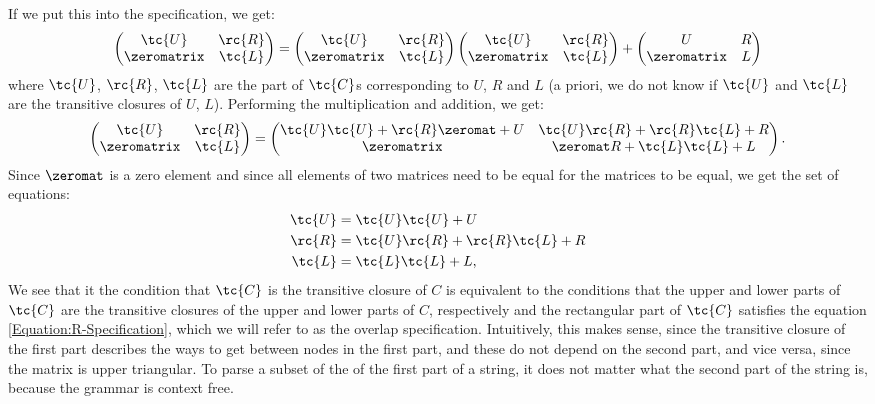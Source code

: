 If we put this into the specification, we get:
\begin{equation*}
  \begin{pmatrix}
    \tc{U} & \rc{R} \\
    \zeromatrix   & \tc{L}
  \end{pmatrix}
  =  
  \begin{pmatrix}
    \tc{U} & \rc{R} \\
    \zeromatrix   & \tc{L}
  \end{pmatrix}
  \begin{pmatrix}
    \tc{U} & \rc{R} \\
    \zeromatrix   & \tc{L}
  \end{pmatrix}
  +
  \begin{pmatrix}
    U & R \\
    \zeromatrix & L
  \end{pmatrix}
\end{equation*}
where $\tc{U}$, $\rc{R}$, $\tc{L}$ are the part of $\tc{C}$s corresponding to $U$, $R$ and $L$ (a priori, we do not know if $\tc{U}$ and $\tc{L}$ are the transitive closures of $U$, $L$). Performing the multiplication and addition, we get:
\begin{equation*}
    \begin{pmatrix}
    \tc{U} & \rc{R} \\
    \zeromatrix   & \tc{L}
  \end{pmatrix} 
    =
  \begin{pmatrix}
    \tc{U}\tc{U} + \rc{R}\zeromat + U   &   \tc{U}\rc{R}     + \rc{R}\tc{L} + R \\
    \zeromatrix                          &   \zeromat R + \tc{L}\tc{L} + L
  \end{pmatrix}.
\end{equation*}
Since $\zeromat$ is a zero element and since all elements of two matrices need to be equal for the matrices to be equal, we get the set of equations:
\begin{align}
  \tc{U} &= \tc{U}\tc{U} + U \\
  \rc{R} &= \tc{U}\rc{R} + \rc{R}\tc{L} + R \label{Equation:R-Specification}\\
  \tc{L} &= \tc{L}\tc{L} + L,
\end{align}
We see that it the condition that $\tc{C}$ is the transitive closure of $C$ is equivalent to the conditions that the upper and lower parts of $\tc{C}$ are the transitive closures of the upper and lower parts of $C$, respectively and the rectangular part of $\tc{C}$ satisfies the equation \eqref{Equation:R-Specification}, which we will refer to as the overlap specification. Intuitively, this makes sense, since the transitive closure of the first part describes the ways to get between nodes in the first part, and these do not depend on the second part, and vice versa, since the matrix is upper triangular. To parse a subset of the of the first part of a string, it does not matter what the second part of the string is, because the grammar is context free.
